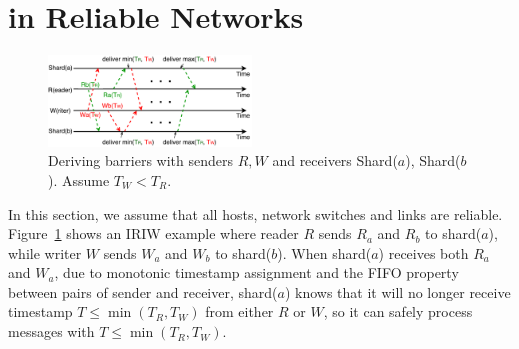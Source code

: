 \section{\sys in Reliable Networks}
\label{sec:design-reliable}

\begin{figure}[t]
\centering
\includegraphics[width=0.48\textwidth]{images/derive_barriers.pdf}
\caption{Deriving barriers with senders $R, W$ and receivers Shard($a$), Shard($b$). Assume $T_W < T_R$.}
\label{fig:barrier}
\vspace{-1em}
\end{figure}

In this section, we assume that all hosts, network switches and links are reliable.
Figure~\ref{fig:barrier} shows an IRIW example where reader $R$ sends $R_a$ and $R_b$ to shard($a$), while writer $W$ sends $W_a$ and $W_b$ to shard($b$).
When shard($a$) receives both $R_a$ and $W_a$, due to monotonic timestamp assignment and the FIFO property between pairs of sender and receiver, shard($a$) knows that it will no longer receive timestamp $T \leq \min(T_R, T_W)$ from either $R$ or $W$, so it can safely process messages with $T \leq \min(T_R, T_W)$.





